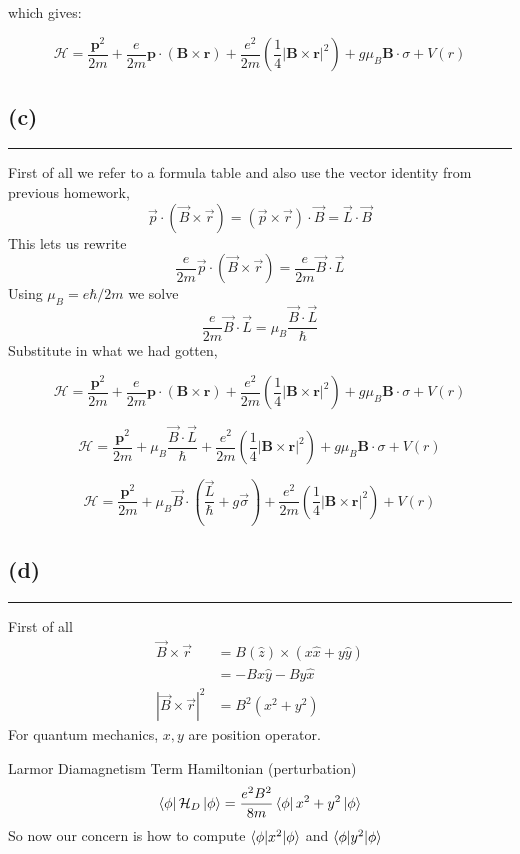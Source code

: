 \documentclass[letter, 10pts]{article}
\newcommand{\hb}{\hbar}
\begin{document}
which gives:

\[
\mathcal{H} = \frac{\mathbf{p}^2}{2m} + \frac{e}{2m} \mathbf{p} \cdot (\mathbf{B} \times \mathbf{r}) + \frac{e^2}{2m} \left( \frac{1}{4} |\mathbf{B} \times \mathbf{r}|^2 \right) + g\mu_B \mathbf{B} \cdot \sigma + V(r)
\]


\subsection*{(c)}
\hrule
First of all we refer to a formula table and also use the vector identity from previous homework,
\[
\vec{p} \cdot  \left(\vec{B} \times \vec{r}\right) = (\vec{p} \times  \vec{r}) \cdot  \vec{B} = \vec{L} \cdot  \vec{B} 
\] 
This lets us rewrite
\[
\frac{e}{2m} \vec{p}\cdot \left(\vec{B} \times \vec{r}\right) = \frac{e}{2m} \vec{B} \cdot  \vec{L} 
\] 	
Using $\mu_B = e \hb / 2 m$ we solve
\[
\frac{e}{2m} \vec{B} \cdot \vec{L} = \mu_B \frac{\vec{B}\cdot \vec{L}}{\hb}
\] 
Substitute in what we had gotten, 


\[
\mathcal{H} = \frac{\mathbf{p}^2}{2m} + \frac{e}{2m} \mathbf{p} \cdot (\mathbf{B} \times \mathbf{r}) + \frac{e^2}{2m} \left( \frac{1}{4} |\mathbf{B} \times \mathbf{r}|^2 \right) + g\mu_B \mathbf{B} \cdot \sigma + V(r)
\]


\[
\mathcal{H} = \frac{\mathbf{p}^2}{2m} + \mu_B \frac{\vec{B}\cdot \vec{L}}{\hb} + \frac{e^2}{2m} \left( \frac{1}{4} |\mathbf{B} \times \mathbf{r}|^2 \right) + g\mu_B \mathbf{B} \cdot \sigma + V(r)
\]

\[\boxed{
\mathcal{H} = \frac{\mathbf{p}^2}{2m} + \mu_B \vec{B}\cdot
\left( \frac{\vec{L}}{{\hb}} + g \vec{\sigma} \right)+ \frac{e^2}{2m} \left( \frac{1}{4} |\mathbf{B} \times \mathbf{r}|^2 \right)+ V(r)
}\]

\subsection*{(d)}
\hrule
First of all 
\begin{align*}
	\vec{B} \times \vec{r} &= B \left(\hat{z}\right) \times  (x \hat{x}  +y \hat{y}  )
	\\
	&=-  B x \hat{y}- B y \hat{x} \\
	| \vec{B} \times  \vec{r} | ^2 &= B^2 (x^2  + y^2)
\end{align*}
For quantum mechanics, $x,y$ are position operator. 

Larmor Diamagnetism Term Hamiltonian (perturbation) 
\[ \bra{\phi}
\mathcal H_D \ket{\phi} = \frac{e^2 B^2}{8 m } \bra{\phi} x^2 + y^2 \ket{\phi}
\]
So now our concern is how to compute $\braket{\phi | x^2 | \phi}$ and $\braket{\phi | y^2 | \phi}$
\end{document}
